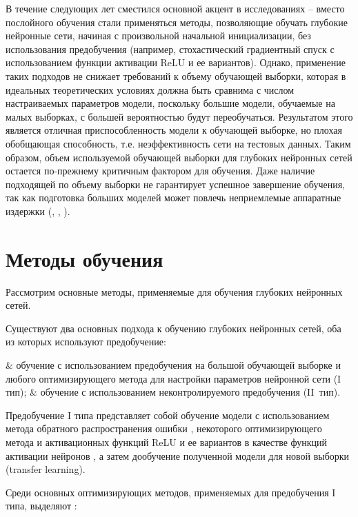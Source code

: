 В течение следующих лет сместился основной акцент в исследованиях -- вместо послойного обучения стали применяться методы, позволяющие обучать глубокие нейронные сети, начиная с произвольной начальной инициализации, без использования предобучения (например, стохастический градиентный спуск с использованием функции активации ReLU и ее вариантов). Однако, применение таких подходов не снижает требований к объему обучающей выборки, которая в идеальных теоретических условиях должна быть сравнима с числом настраиваемых параметров модели, поскольку большие модели, обучаемые на малых выборках, с большей вероятностью будут переобучаться. Результатом этого является отличная приспособленность модели к обучающей выборке, но плохая обобщающая способность, т.е. неэффективность сети на тестовых данных. Таким образом, объем используемой обучающей выборки для глубоких нейронных сетей остается по-прежнему критичным фактором для обучения. Даже наличие подходящей по объему выборки не гарантирует успешное завершение обучения, так как подготовка больших моделей может повлечь неприемлемые аппаратные издержки (\cite{alpaca2023}, \cite{alpacagithub}, \cite{zhang2022opt}).

\section{Методы обучения}

Рассмотрим основные методы, применяемые для обучения глубоких нейронных сетей.

Существуют два основных подхода к обучению глубоких нейронных сетей, оба из которых используют предобучение:

\begin{easylistNum}    
    & обучение с использованием предобучения на большой обучающей выборке и любого оптимизирующего метода для настройки параметров нейронной сети (I тип);
	& обучение с использованием неконтролируемого предобучения (II~тип).
\end{easylistNum}

Предобучение I типа представляет собой обучение модели с использованием метода обратного распространения ошибки \cite{Glorot2011}, некоторого оптимизирующего метода и активационных функций ReLU и ее вариантов в качестве функций активации нейронов \cite{LeCun2015}, а затем дообучение полученной модели для новой выборки (transfer learning). 

Среди основных оптимизирующих методов, применяемых для предобучения I типа, выделяют \cite{Goodfellow2017}:

